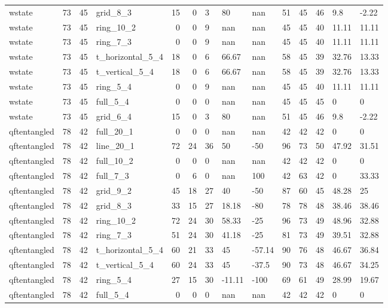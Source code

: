 \begin{longtable}{lrrlrrlllrrlll}
wstate & 73 & 45 & grid\_8\_3 & 15 & 0 & 3 & 80 & nan & 51 & 45 & 46 & 9.8 & -2.22 \\
wstate & 73 & 45 & ring\_10\_2 & 0 & 0 & 9 & nan & nan & 45 & 45 & 40 & 11.11 & 11.11 \\
wstate & 73 & 45 & ring\_7\_3 & 0 & 0 & 9 & nan & nan & 45 & 45 & 40 & 11.11 & 11.11 \\
wstate & 73 & 45 & t\_horizontal\_5\_4 & 18 & 0 & 6 & 66.67 & nan & 58 & 45 & 39 & 32.76 & 13.33 \\
wstate & 73 & 45 & t\_vertical\_5\_4 & 18 & 0 & 6 & 66.67 & nan & 58 & 45 & 39 & 32.76 & 13.33 \\
wstate & 73 & 45 & ring\_5\_4 & 0 & 0 & 9 & nan & nan & 45 & 45 & 40 & 11.11 & 11.11 \\
wstate & 73 & 45 & full\_5\_4 & 0 & 0 & 0 & nan & nan & 45 & 45 & 45 & 0 & 0 \\
wstate & 73 & 45 & grid\_6\_4 & 15 & 0 & 3 & 80 & nan & 51 & 45 & 46 & 9.8 & -2.22 \\
qftentangled & 78 & 42 & full\_20\_1 & 0 & 0 & 0 & nan & nan & 42 & 42 & 42 & 0 & 0 \\
qftentangled & 78 & 42 & line\_20\_1 & 72 & 24 & 36 & 50 & -50 & 96 & 73 & 50 & 47.92 & 31.51 \\
qftentangled & 78 & 42 & full\_10\_2 & 0 & 0 & 0 & nan & nan & 42 & 42 & 42 & 0 & 0 \\
qftentangled & 78 & 42 & full\_7\_3 & 0 & 6 & 0 & nan & 100 & 42 & 63 & 42 & 0 & 33.33 \\
qftentangled & 78 & 42 & grid\_9\_2 & 45 & 18 & 27 & 40 & -50 & 87 & 60 & 45 & 48.28 & 25 \\
qftentangled & 78 & 42 & grid\_8\_3 & 33 & 15 & 27 & 18.18 & -80 & 78 & 78 & 48 & 38.46 & 38.46 \\
qftentangled & 78 & 42 & ring\_10\_2 & 72 & 24 & 30 & 58.33 & -25 & 96 & 73 & 49 & 48.96 & 32.88 \\
qftentangled & 78 & 42 & ring\_7\_3 & 51 & 24 & 30 & 41.18 & -25 & 81 & 73 & 49 & 39.51 & 32.88 \\
qftentangled & 78 & 42 & t\_horizontal\_5\_4 & 60 & 21 & 33 & 45 & -57.14 & 90 & 76 & 48 & 46.67 & 36.84 \\
qftentangled & 78 & 42 & t\_vertical\_5\_4 & 60 & 24 & 33 & 45 & -37.5 & 90 & 73 & 48 & 46.67 & 34.25 \\
qftentangled & 78 & 42 & ring\_5\_4 & 27 & 15 & 30 & -11.11 & -100 & 69 & 61 & 49 & 28.99 & 19.67 \\
qftentangled & 78 & 42 & full\_5\_4 & 0 & 0 & 0 & nan & nan & 42 & 42 & 42 & 0 & 0 \\

\end{longtable}
